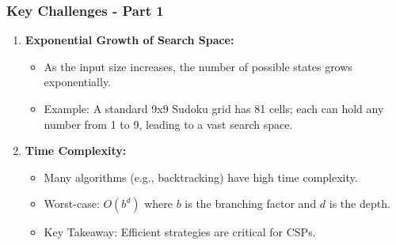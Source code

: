 \documentclass[aspectratio=169]{beamer}
\begin{document}
\begin{frame}[fragile]
    \frametitle{Key Challenges - Part 1}
    \begin{enumerate}
        \item \textbf{Exponential Growth of Search Space:}
        \begin{itemize}
            \item As the input size increases, the number of possible states grows exponentially.
            \item Example: A standard 9x9 Sudoku grid has 81 cells; each can hold any number from 1 to 9, leading to a vast search space.
        \end{itemize}
        
        \item \textbf{Time Complexity:}
        \begin{itemize}
            \item Many algorithms (e.g., backtracking) have high time complexity.
            \item Worst-case: \( O(b^d) \) where \( b \) is the branching factor and \( d \) is the depth.
            \item Key Takeaway: Efficient strategies are critical for CSPs.
        \end{itemize}
    \end{enumerate}
\end{frame}
\end{document}
